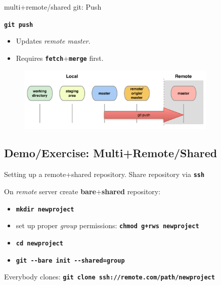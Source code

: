 \documentclass{beamer}
\newcommand{\git}{git\xspace}
\begin{document}

\begin{frame}{multi+remote/shared \git: Push}
  \begin{center}
    \texttt{\textbf{git push}}
  \end{center}
  \begin{itemize}
  \item Updates \emph{remote master}.
  \item Requires \texttt{\textbf{fetch}}+\texttt{\textbf{merge}} first.
  \end{itemize}
  \begin{figure}
    \centering
    \includegraphics[width=9.5cm]{figs/local-remote-push}
  \end{figure}
\end{frame}


\subsection{Demo/Exercise: Multi+Remote/Shared}


\begin{frame}{Setting up a remote+shared repository. }
  Share repository via \texttt{\textbf{ssh}}
  \begin{block}{On \emph{remote} server create
      \textbf{bare}+\textbf{shared} repository:}
    \begin{itemize}
    \item \texttt{\textbf{mkdir newproject}}
    \item set up proper \emph{group} permissions: \texttt{\textbf{chmod g+rw\alert{s} newproject}}
    \item \texttt{\textbf{cd newproject}}
    \item \texttt{\textbf{git \alert{-{}-bare} init \alert{-{}-shared=group}}}
    \end{itemize}
  \end{block}
  Everybody clones: \texttt{\textbf{git clone ssh://remote.com/path/newproject}}
\end{frame}
\end{document}
